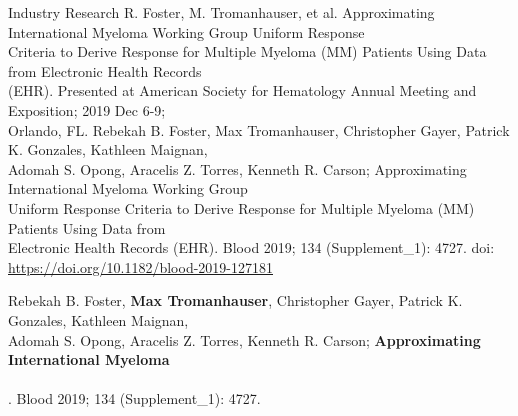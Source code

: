 \documentclass{resume} %
\begin{document}
\begin{grouping}{Industry Research}
\iffalse
\hspace*{1mm}R. Foster, M. Tromanhauser, et al. Approximating International Myeloma Working Group Uniform Response \\
\hspace*{1mm}Criteria to Derive Response for Multiple Myeloma (MM) Patients Using Data from Electronic Health Records\\
\hspace*{1mm}(EHR). Presented at American Society for Hematology Annual Meeting and Exposition; 2019 Dec 6-9; \\
\hspace*{1mm}Orlando, FL.
\hspace*{1mm}Rebekah B. Foster, Max Tromanhauser, Christopher Gayer, Patrick K. Gonzales, Kathleen Maignan, \\
\hspace*{2mm}Adomah S. Opong, Aracelis Z. Torres, Kenneth R. Carson; Approximating International Myeloma Working Group \\
\hspace*{2mm}Uniform Response Criteria to Derive Response for Multiple Myeloma (MM) Patients Using Data from \\
\hspace*{2mm}Electronic Health Records (EHR). Blood 2019; 134 (Supplement\_1): 4727. doi: \\
\hspace*{2mm}\href{https://doi.org/10.1182/blood-2019-127181}{https://doi.org/10.1182/blood-2019-127181}

\hspace*{1mm}Rebekah B. Foster, {\bf Max Tromanhauser}, Christopher Gayer, Patrick K. Gonzales, Kathleen Maignan, \\
\hspace*{3mm}Adomah S. Opong, Aracelis Z. Torres, Kenneth R. Carson; {\bf Approximating International Myeloma } \\
\hspace*{3mm}{\bf Working Group Uniform Response Criteria to Derive Response for Multiple Myeloma (MM)} \\
\hspace*{3mm}{\bf Patients Using Data from Electronic Health Records (EHR)}. Blood 2019; 134 (Supplement\_1): 4727.


\end{grouping}
\end{document}

